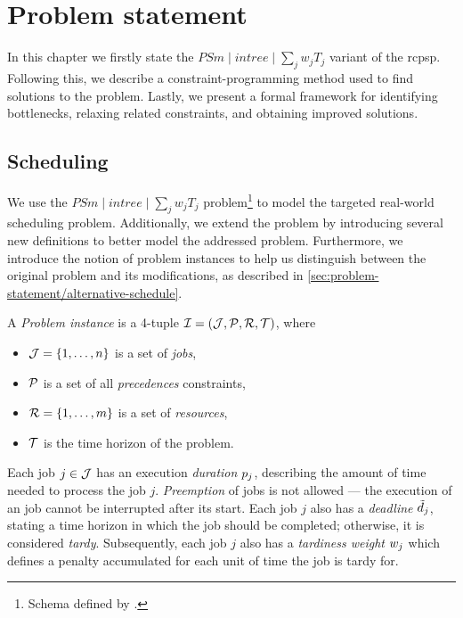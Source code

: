 \chapter{Problem statement} \label{chap:problem-statement}

In this chapter we firstly state the $PSm \;|\; intree \;|\; \sum_{j} w_j T_j$ variant of the \ac{rcpsp}.
Following this, we describe a constraint-programming method used to find solutions to the problem.
Lastly, we present a formal framework for identifying bottlenecks, relaxing related constraints,
and obtaining improved solutions.

\section{Scheduling} \label{sec:problem-statement/scheduling}

We use the $PSm \;|\; intree \;|\; \sum_{j} w_j T_j$ problem\footnote{Schema defined by \citet{BRUCKER1999}.}
to model the targeted real-world scheduling problem.
Additionally, we extend the problem by introducing several new definitions to better model the addressed problem.
Furthermore, we  introduce the notion of problem instances to help us distinguish between the original problem
and its modifications, as described in \cref{sec:problem-statement/alternative-schedule}.

A \emph{Problem instance} is a 4-tuple $\mathcal{I} = (\mathcal{J}, \mathcal{P}, \mathcal{R}, \mathcal{T})$,
where

\begin{itemize}
    \item $\mathcal{J} = \{1, \dots, n\}$ is a set of \emph{jobs},
    \item $\mathcal{P}$ is a set of all \emph{precedences} constraints,
    \item $\mathcal{R} = \{1, \dots, m\}$ is a set of \emph{resources},
    \item $\mathcal{T}$ is the time horizon of the problem.
\end{itemize}

Each job $j \in \mathcal{J}$ has an execution \emph{duration} $p_{j}$,
describing the amount of time needed to process the job $j$.
\emph{Preemption} of jobs is not allowed
--- the execution of an job cannot be interrupted after its start.
Each job $j$ also has a \emph{deadline} $\tilde{d}_{j}$,
stating a time horizon in which the job should be completed;
otherwise, it is considered \emph{tardy}.
Subsequently, each job $j$ also has a \emph{tardiness weight} $w_{j}$
which defines a penalty accumulated for each unit of time the job is tardy for.

